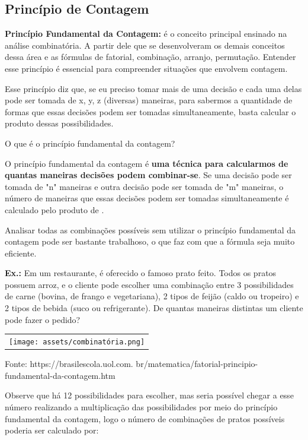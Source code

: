 \begin{multicols*}{2}
	\section{Princípio de Contagem}
	
	\textbf{Princípio Fundamental da Contagem:} é o  conceito principal ensinado na análise combinatória. A partir dele que se desenvolveram os demais conceitos dessa área e as fórmulas de fatorial, combinação, arranjo, permutação. Entender esse princípio é essencial para compreender situações que envolvem contagem.

Esse princípio diz que, se eu preciso tomar mais de uma decisão e cada uma delas pode ser tomada de x, y, z (diversas) maneiras, para sabermos a quantidade de formas que essas decisões podem ser tomadas simultaneamente, basta calcular o produto dessas possibilidades.

O que é o princípio fundamental da contagem?

O princípio fundamental da contagem é \textbf{uma técnica para calcularmos de quantas maneiras decisões podem combinar-se}. Se uma decisão pode ser tomada de "n" maneiras e outra decisão pode ser tomada de "m" maneiras, o número de maneiras que essas decisões podem ser tomadas simultaneamente é calculado pelo produto de .

Analisar todas as combinações possíveis sem utilizar o princípio fundamental da contagem pode ser bastante trabalhoso, o que faz com que a fórmula seja muito eficiente.

\textbf{Ex.:} Em um restaurante, é oferecido o famoso prato feito. Todos os pratos possuem arroz, e o cliente pode escolher uma combinação entre 3 possibilidades de carne (bovina, de frango e vegetariana), 2 tipos de feijão (caldo ou tropeiro) e 2 tipos de bebida (suco ou refrigerante). De quantas maneiras distintas um cliente pode fazer o pedido?

		\begin{tabular}{@{}c@{}}
		  \texttt{[image: assets/combinatória.png]}
		\end{tabular}   
		Fonte: https://brasilescola.uol.com. br/matematica/fatorial-principio- fundamental-da-contagem.htm
	
		Observe que há 12 possibilidades para escolher, mas seria possível chegar a esse número realizando a multiplicação das possibilidades por meio do princípio fundamental da contagem, logo o número de combinações de pratos possíveis poderia ser calculado por:


\end{multicols*}
